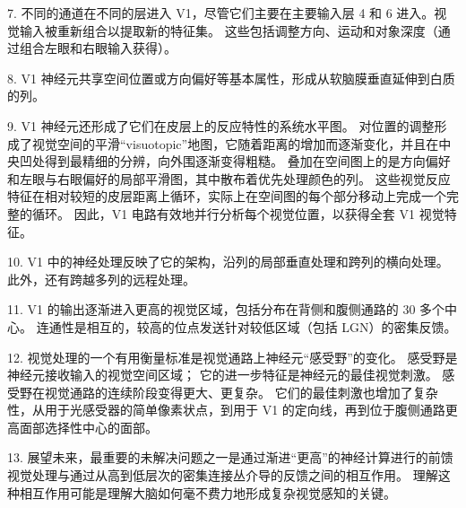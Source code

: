 7. 不同的通道在不同的层进入 V1，尽管它们主要在主要输入层 4 和 6 进入。视觉输入被重新组合以提取新的特征集。 
这些包括调整方向、运动和对象深度（通过组合左眼和右眼输入获得）。
 

8. V1 神经元共享空间位置或方向偏好等基本属性，形成从软脑膜垂直延伸到白质的列。
 


9. V1 神经元还形成了它们在皮层上的反应特性的系统水平图。 
对位置的调整形成了视觉空间的平滑“visuotopic”地图，它随着距离的增加而逐渐变化，并且在中央凹处得到最精细的分辨，向外围逐渐变得粗糙。 
叠加在空间图上的是方向偏好和左眼与右眼偏好的局部平滑图，其中散布着优先处理颜色的列。 
这些视觉反应特征在相对较短的皮层距离上循环，实际上在空间图的每个部分移动上完成一个完整的循环。 
因此，V1 电路有效地并行分析每个视觉位置，以获得全套 V1 视觉特征。 


10. V1 中的神经处理反映了它的架构，沿列的局部垂直处理和跨列的横向处理。 
此外，还有跨越多列的远程处理。 


11. V1 的输出逐渐进入更高的视觉区域，包括分布在背侧和腹侧通路的 30 多个中心。 
连通性是相互的，较高的位点发送针对较低区域（包括 LGN）的密集反馈。 


12. 视觉处理的一个有用衡量标准是视觉通路上神经元“感受野”的变化。 
感受野是神经元接收输入的视觉空间区域； 它的进一步特征是神经元的最佳视觉刺激。 
感受野在视觉通路的连续阶段变得更大、更复杂。 
它们的最佳刺激也增加了复杂性，从用于光感受器的简单像素状点，到用于 V1 的定向线，再到位于腹侧通路更高面部选择性中心的面部。 


13. 展望未来，最重要的未解决问题之一是通过渐进“更高”的神经计算进行的前馈视觉处理与通过从高到低层次的密集连接丛介导的反馈之间的相互作用。 
理解这种相互作用可能是理解大脑如何毫不费力地形成复杂视觉感知的关键。

